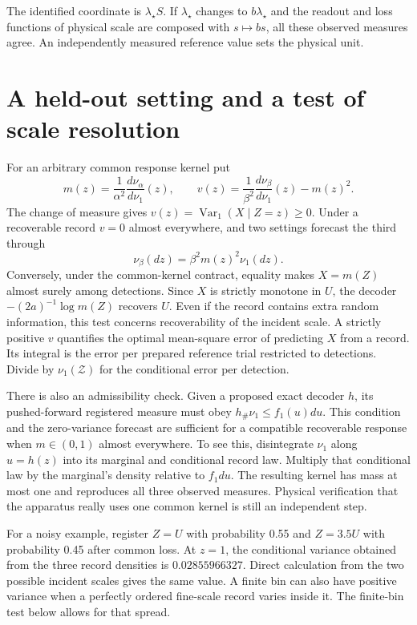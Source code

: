 \documentclass[10pt,a4paper]{article}
\begin{document}
The identified coordinate is $\lambda_\star S$. If $\lambda_\star$ changes to $b\lambda_\star$ and the readout and loss functions of physical scale are composed with $s\mapsto bs$, all these observed measures agree. An independently measured reference value sets the physical unit.

\section{A held-out setting and a test of scale resolution}
For an arbitrary common response kernel put
\[
 m(z)=\frac1{\alpha^2}\frac{d\nu_\alpha}{d\nu_1}(z),\qquad
 v(z)=\frac1{\beta^2}\frac{d\nu_\beta}{d\nu_1}(z)-m(z)^2.
\]
The change of measure gives $v(z)=\operatorname{Var}_1(X\mid Z=z)\ge0$. Under a recoverable record $v=0$ almost everywhere, and two settings forecast the third through
\[
 \nu_\beta(dz)=\beta^2 m(z)^2\nu_1(dz).
\]
Conversely, under the common-kernel contract, equality makes $X=m(Z)$ almost surely among detections. Since $X$ is strictly monotone in $U$, the decoder $-(2a)^{-1}\log m(Z)$ recovers $U$. Even if the record contains extra random information, this test concerns recoverability of the incident scale. A strictly positive $v$ quantifies the optimal mean-square error of predicting $X$ from a record. Its integral is the error per prepared reference trial restricted to detections. Divide by $\nu_1(\mathcal Z)$ for the conditional error per detection.

There is also an admissibility check. Given a proposed exact decoder $h$, its pushed-forward registered measure must obey $h_\#\nu_1\le f_1(u)du$. This condition and the zero-variance forecast are sufficient for a compatible recoverable response when $m\in(0,1)$ almost everywhere. To see this, disintegrate $\nu_1$ along $u=h(z)$ into its marginal and conditional record law. Multiply that conditional law by the marginal's density relative to $f_1 du$. The resulting kernel has mass at most one and reproduces all three observed measures. Physical verification that the apparatus really uses one common kernel is still an independent step.

For a noisy example, register $Z=U$ with probability 0.55 and $Z=3.5U$ with probability 0.45 after common loss. At $z=1$, the conditional variance obtained from the three record densities is $0.02855966327$. Direct calculation from the two possible incident scales gives the same value. A finite bin can also have positive variance when a perfectly ordered fine-scale record varies inside it. The finite-bin test below allows for that spread.
\end{document}
